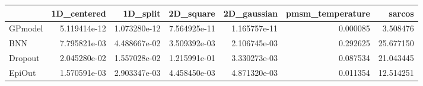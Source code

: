 \begin{tabular}{lrrrrrr}
\toprule
{} &   1D\_centered &      1D\_split &     2D\_square &   2D\_gaussian &  pmsm\_temperature &     sarcos \\
\midrule
GPmodel &  5.119414e-12 &  1.073280e-12 &  7.564925e-11 &  1.165757e-11 &          0.000085 &   3.508476 \\
BNN     &  7.795821e-03 &  4.488667e-02 &  3.509392e-03 &  2.106745e-03 &          0.292625 &  25.677150 \\
Dropout &  2.045280e-02 &  1.557028e-02 &  1.215991e-01 &  3.330273e-03 &          0.087534 &  21.043445 \\
EpiOut  &  1.570591e-03 &  2.903347e-03 &  4.458450e-03 &  4.871320e-03 &          0.011354 &  12.514251 \\
\bottomrule
\end{tabular}
